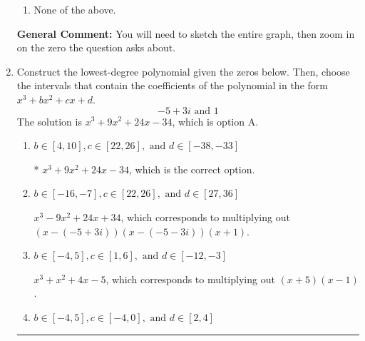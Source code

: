 \documentclass{extbook}[14pt]
\newcommand{\litem}[1]{\item #1

\rule{\textwidth}{0.4pt}}
\begin{document}
\begin{enumerate}
{\begin{enumerate}[label=\Alph*.]
\item None of the above.\end{enumerate}
\textbf{General Comment:} You will need to sketch the entire graph, then zoom in on the zero the question asks about.
}
\litem{
Construct the lowest-degree polynomial given the zeros below. Then, choose the intervals that contain the coefficients of the polynomial in the form $x^3+bx^2+cx+d$.
\[ -5 + 3 i \text{ and } 1 \]The solution is \( x^{3} +9 x^{2} +24 x -34 \), which is option A.\begin{enumerate}[label=\Alph*.]
\item \( b \in [4, 10], c \in [22, 26], \text{ and } d \in [-38, -33] \)

* $x^{3} +9 x^{2} +24 x -34$, which is the correct option.
\item \( b \in [-16, -7], c \in [22, 26], \text{ and } d \in [27, 36] \)

$x^{3} -9 x^{2} +24 x + 34$, which corresponds to multiplying out $(x-(-5 + 3 i))(x-(-5 - 3 i))(x + 1)$.
\item \( b \in [-4, 5], c \in [1, 6], \text{ and } d \in [-12, -3] \)

$x^{3} + x^{2} +4 x -5$, which corresponds to multiplying out $(x + 5)(x -1)$.
\item \( b \in [-4, 5], c \in [-4, 0], \text{ and } d \in [2, 4] \)


\end{enumerate}}
\end{enumerate}
\end{document}
